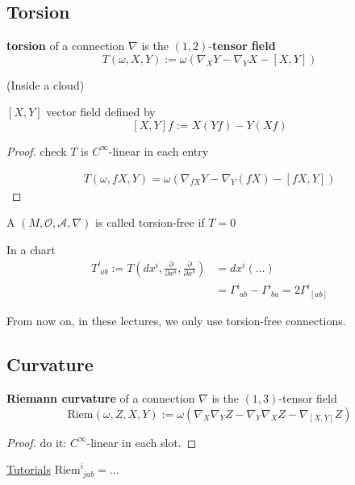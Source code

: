 
\subsection{Torsion}
\begin{definition}
  \textbf{torsion} of a connection $\nabla$ is the $(1,2)$-\textbf{tensor field}
\begin{equation}
  T(\omega,X,Y) := \omega( \nabla_X Y - \nabla_Y X - [X,Y])
\end{equation}
\end{definition}

(Inside a cloud) 

$[X,Y]$ vector field defined by 
\[
[X,Y]f:= X(Yf) - Y(Xf)
\]

\begin{proof}
  check $T$ is $C^{\infty}$-linear in each entry

\[
\begin{gathered}
  T(\omega, fX,Y) = \omega ( \nabla_{fX} Y - \nabla_Y (fX) - [fX,Y] )
\end{gathered}
\]
\end{proof}

\begin{definition}
  A $(M, \mathcal{O}, \mathcal{A}, \nabla)$ is called torsion-free if $T=0$
\end{definition}

In a chart 
\[
\begin{aligned}
  T^i_{ \, \, ab } := T\left(dx^i , \frac{ \partial }{ \partial x^a} , \frac{ \partial }{ \partial x^b}  \right) & = dx^i ( \dots ) \\ 
  & = \Gamma^i_{ \, \, ab} - \Gamma^i_{ \, \, ba} = 2 \Gamma^i_{ \, \, [ab] }
\end{aligned}
\]

From now on, in these lectures, we only use torsion-free connections. 

\subsection{Curvature}

\begin{definition}
  \textbf{Riemann curvature} of a connection $\nabla$ is the $(1,3)$-tensor field
\begin{equation}
  \text{Riem}(\omega,Z,X,Y) := \omega( \nabla_X \nabla_Y Z - \nabla_Y \nabla_X Z - \nabla_{[X,Y]} Z)
\end{equation}
\end{definition}
\begin{proof}
  do it: $C^{\infty}$-linear in each slot.  
\end{proof}

\underline{Tutorials} $\text{Riem}^i_{ \,\, jab} = \dots $
